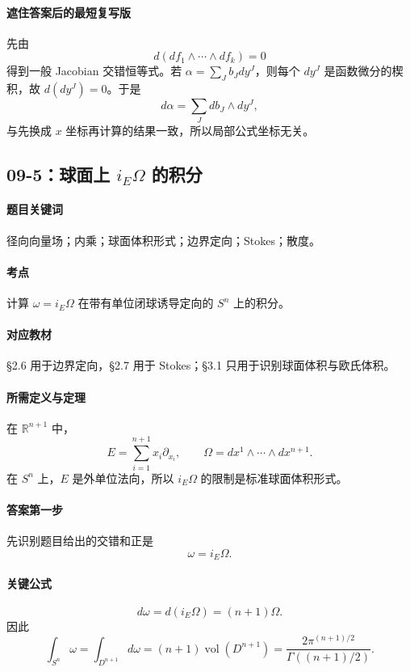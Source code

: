 \documentclass[12pt,a4paper]{ctexart}
\newcommand{\R}{\mathbb R}
\newcommand{\vol}{\operatorname{vol}}
\begin{document}
\paragraph{遮住答案后的最短复写版}
先由
\[
  d(df_1\wedge\cdots\wedge df_k)=0
\]
得到一般 Jacobian 交错恒等式。若 $\alpha=\sum_Jb_Jdy^J$，则每个 $dy^J$ 是函数微分的楔积，故 $d(dy^J)=0$。于是
\[
  d\alpha=\sum_Jdb_J\wedge dy^J,
\]
与先换成 $x$ 坐标再计算的结果一致，所以局部公式坐标无关。

\subsection{09-5：球面上 \(i_E\Omega\) 的积分}

\paragraph{题目关键词}
径向向量场；内乘；球面体积形式；边界定向；Stokes；散度。

\paragraph{考点}
计算 $\omega=i_E\Omega$ 在带有单位闭球诱导定向的 $S^n$ 上的积分。

\paragraph{对应教材}
\S 2.6 用于边界定向，\S 2.7 用于 Stokes；\S 3.1 只用于识别球面体积与欧氏体积。

\paragraph{所需定义与定理}
在 $\R^{n+1}$ 中，
\[
  E=\sum_{i=1}^{n+1}x_i\partial_{x_i},\qquad
  \Omega=dx^1\wedge\cdots\wedge dx^{n+1}.
\]
在 $S^n$ 上，$E$ 是外单位法向，所以 $i_E\Omega$ 的限制是标准球面体积形式。

\paragraph{答案第一步}
先识别题目给出的交错和正是
\[
  \omega=i_E\Omega.
\]

\paragraph{关键公式}
\[
  d\omega=d(i_E\Omega)=(n+1)\Omega.
\]
因此
\[
  \int_{S^n}\omega
  =
  \int_{D^{n+1}}d\omega
  =
  (n+1)\vol(D^{n+1})
  =
  \frac{2\pi^{(n+1)/2}}{\Gamma((n+1)/2)}.
\]
\end{document}
